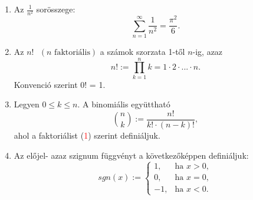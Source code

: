 \documentclass{article}
\begin{document}
    \begin{enumerate}[label=\alph*)]
    \item 
        Az $ \frac{1}{n^2} $ sorösszege:
            \[ \sum_{n=1}^{\infty} \frac{1}{n^2} = \frac{\pi^2}{6}. \]
    
    \item
        Az $n!\text{ }(n \text{ faktoriális})$ a számok szorzata 1-től $n$-ig, azaz
            \begin{equation}
                n! := \prod_{k=1}^n k = 1\cdot2\cdot...\cdot n.
            \end{equation}
        Konvenció szerint 0! = 1.
    
    \item
        Legyen $0 \leq k \leq n. $ A binomiális együttható
            \[ \binom{n}{k} := \frac{n!}{k! \cdot (n-k)!}, \]
        ahol a faktoriálist (\textcolor{red}{1}) szerint definiáljuk.
    
    \item
        Az előjel- azaz szignum függvényt a következőképpen definiáljuk:
            \[ sgn(x) := \begin{cases}
                            1, & \text{ha } x > 0, \\
                            0, & \text{ha } x = 0, \\
                            -1, & \text{ha } x < 0.
                         \end{cases}\]
                     
    \end{enumerate}
    
\end{document}
